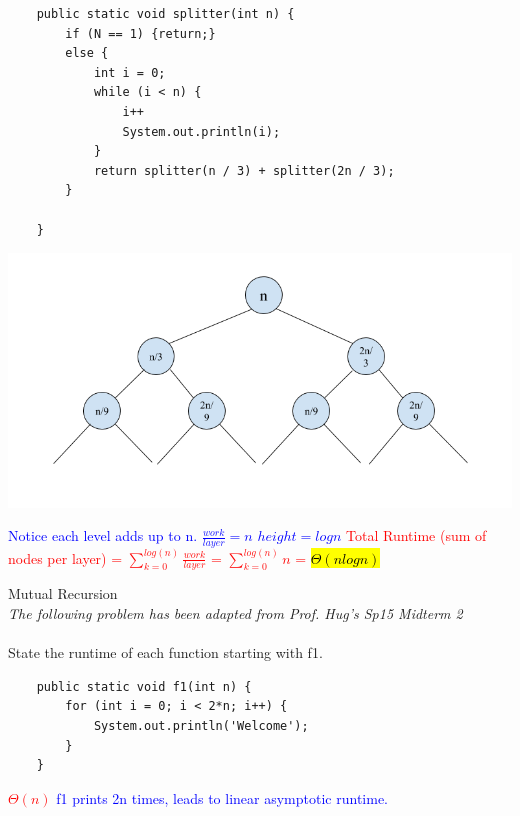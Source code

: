 \documentclass[11pt,letterpaper]{article}
\begin{document}
\newpage
\begin{lstlisting}
    public static void splitter(int n) {
        if (N == 1) {return;}
        else {
            int i = 0;
            while (i < n) {
                i++
                System.out.println(i);
            }
            return splitter(n / 3) + splitter(2n / 3);
        }
        
    }
\end{lstlisting}
\begin{center}
    \includegraphics[scale=0.4]{images/splitter.png}    
\end{center}
\textcolor{blue}{Notice each level adds up to n.
\newline
\newline
$\frac{work}{layer} = n$
\newline
\newline
$height = logn$
}
\newline
\newline
\textcolor{red}{Total Runtime (sum of nodes per layer) = $\sum_{k=0}^{log(n)}\frac{work}{layer}$ = $\sum_{k=0}^{log(n)}n$ = \hl{$\Theta(nlogn)$}}


\newpage
\problem Mutual Recursion 
\\
\textit{The following problem has been adapted from Prof. Hug's Sp15 Midterm 2}
\\
\\
State the runtime of each function starting with f1.
\begin{lstlisting}
    public static void f1(int n) {
        for (int i = 0; i < 2*n; i++) {
            System.out.println('Welcome');
        }
    }
\end{lstlisting}
\textcolor{red}{$\Theta(n)$}
\newline
\textcolor{blue}{f1 prints 2n times, leads to linear asymptotic runtime.}
\newline
\end{document}
